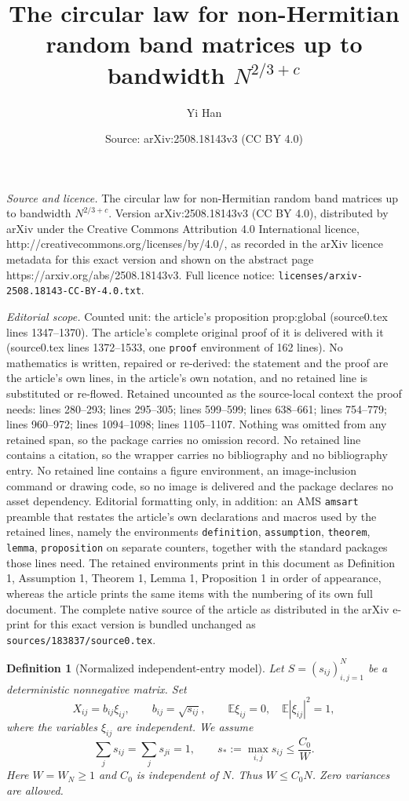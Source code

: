 \documentclass[10pt,a4paper]{amsart}
\title{The circular law for non-Hermitian random band matrices up to bandwidth $N^{2/3+c}$}
\author{Yi Han}
\date{Source: arXiv:2508.18143v3 (CC BY 4.0)}
\newtheorem{definition}{Definition}
\begin{document}
\maketitle

\noindent\emph{Source and licence.} The circular law for non-Hermitian random band matrices up to bandwidth $N^{2/3+c}$. Version arXiv:2508.18143v3 (CC BY 4.0), distributed by arXiv under the Creative Commons Attribution 4.0 International licence, http://creativecommons.org/licenses/by/4.0/, as recorded in the arXiv licence metadata for this exact version and shown on the abstract page https://arxiv.org/abs/2508.18143v3. Full licence notice: \texttt{licenses/arxiv-2508.18143-CC-BY-4.0.txt}.\par\smallskip

\noindent\textit{Editorial scope.} Counted unit: the article's proposition prop:global (source0.tex lines 1347--1370). The article's complete original proof of it is delivered with it (source0.tex lines 1372--1533, one \texttt{proof} environment of 162 lines). No mathematics is written, repaired or re-derived: the statement and the proof are the article's own lines, in the article's own notation, and no retained line is substituted or re-flowed.  Retained uncounted as the source-local context the proof needs: lines 280--293; lines 295--305; lines 599--599; lines 638--661; lines 754--779; lines 960--972; lines 1094--1098; lines 1105--1107.  Nothing was omitted from any retained span, so the package carries no omission record.  No retained line contains a citation, so the wrapper carries no bibliography and no bibliography entry.  No retained line contains a figure environment, an image-inclusion command or drawing code, so no image is delivered and the package declares no asset dependency.  Editorial formatting only, in addition: an AMS \texttt{amsart} preamble that restates the article's own declarations and macros used by the retained lines, namely the environments \texttt{definition}, \texttt{assumption}, \texttt{theorem}, \texttt{lemma}, \texttt{proposition} on separate counters, together with the standard packages those lines need.  The retained environments print in this document as Definition 1, Assumption 1, Theorem 1, Lemma 1, Proposition 1 in order of appearance, whereas the article prints the same items with the numbering of its own full document.  The complete native source of the article as distributed in the arXiv e-print for this exact version is bundled unchanged as \texttt{sources/183837/source0.tex}.
\begin{definition}[Normalized independent-entry model]\label{mainassumptionbands}
Let $S=(s_{ij})_{i,j=1}^N$ be a deterministic nonnegative matrix. Set
\[
 X_{ij}=b_{ij}\xi_{ij},\qquad b_{ij}=\sqrt{s_{ij}},
 \qquad \mathbb E\xi_{ij}=0,\quad \mathbb E|\xi_{ij}|^2=1,
\]
where the variables $\xi_{ij}$ are independent. We assume
\begin{equation}\label{eq:normalized-profile}
 \sum_j s_{ij}=\sum_j s_{ji}=1,\qquad
 s_*:=\max_{i,j}s_{ij}\leq \frac{C_0}{W}.
\end{equation}
Here $W=W_N\geq1$ and $C_0$ is independent of $N$. Thus
$W\leq C_0N$. Zero variances are allowed. 
\end{definition}
\end{document}

